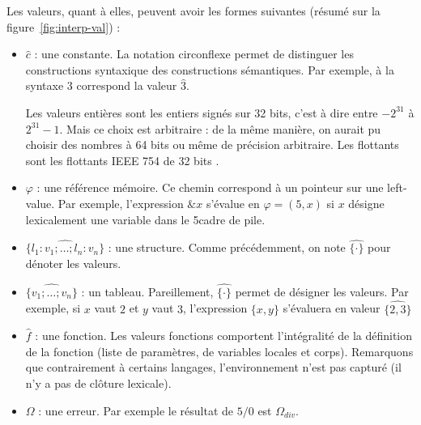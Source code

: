 Les valeurs, quant à elles, peuvent avoir les formes suivantes (résumé sur la
figure~\ref{fig:interp-val}) :

\begin{itemize}
\item

$\widehat{c}$ : une constante. La notation circonflexe permet de distinguer
les constructions syntaxique des constructions sémantiques. Par exemple, à la
syntaxe $3$ correspond la valeur $\widehat{3}$.

Les valeurs entières sont les entiers signés sur 32 bits, c'est à dire entre
$-2^{31}$ à $2^{31}-1$. Mais ce choix est arbitraire : de la même manière, on
aurait pu choisir des nombres à 64 bits ou même de précision arbitraire.
Les flottants sont les flottants IEEE 754 de 32 bits \cite{ieee754}.

\item

$φ$ : une référence mémoire. Ce chemin correspond à un pointeur sur une
left-value. Par exemple, l'expression $\&x$ s'évalue en $φ = (5, x)$ si $x$
désigne lexicalement une variable dans le 5\ieme cadre de pile.

\item

$\widehat{ \{ l_1 : v_1 ; … ; l_n : v_n \} }$ : une structure. Comme
précédemment, on note $\widehat{\{\cdot\}}$ pour dénoter les valeurs.

\item

$\widehat{ \{v_1 ;…; v_n\} }$ : un tableau. Pareillement, $\widehat{\{\cdot\}}$
permet de désigner les valeurs. Par exemple, si $x$ vaut $2$ et $y$ vaut $3$,
l'expression $\{ x, y \}$ s'évaluera en valeur $\widehat{\{ 2, 3 \}}$

\item

$\widehat{f}$ : une fonction. Les valeurs fonctions comportent l'intégralité de
la définition de la fonction (liste de paramètres, de variables locales et
corps). Remarquons que contrairement à certains langages, l'environnement n'est
pas capturé (il n'y a pas de clôture lexicale).


\item $Ω$ : une erreur. Par exemple le résultat de $5 / 0$ est $Ω_{div}$.


\end{itemize}

